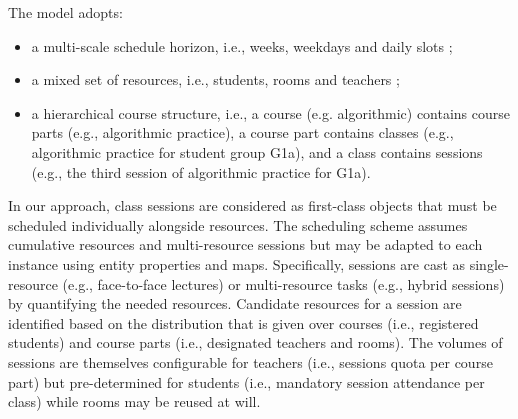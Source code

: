 The {\UTP} model adopts:
\begin{itemize}
    \item a multi-scale schedule horizon, i.e., weeks, weekdays and daily slots ;
    \item a mixed set of resources, i.e., students, rooms and teachers ;
    \item a hierarchical course structure, i.e., a course (e.g. algorithmic) contains course parts (e.g., algorithmic practice), a course part contains classes (e.g., algorithmic practice for student group G1a), and a class contains sessions (e.g., the third session of algorithmic practice for G1a).
\end{itemize}
In our approach, class sessions are considered as first-class objects that must be scheduled individually alongside resources. %
The scheduling scheme assumes cumulative resources and multi-resource sessions 
but may be adapted to each instance using entity properties and maps. 
Specifically, 
sessions are cast as single-resource %
(e.g., face-to-face lectures) or multi-resource tasks (e.g., hybrid sessions) %
by quantifying the needed resources. 
Candidate resources for a session are identified based on the distribution that is given over courses (i.e., registered students) and course parts (i.e., designated teachers and rooms). 
The volumes of sessions are themselves configurable for teachers (i.e., sessions quota per course part) but pre-determined for students (i.e., mandatory session attendance per class) while rooms may be reused at will. %


